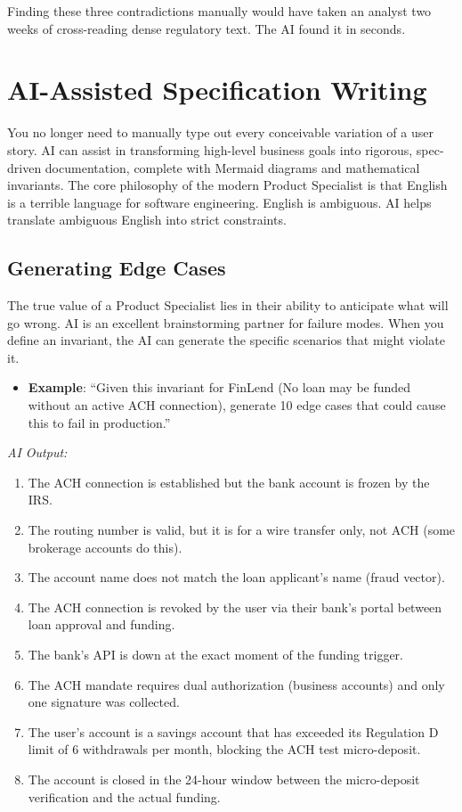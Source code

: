 Finding these three contradictions manually would have taken an analyst
two weeks of cross-reading dense regulatory text. The AI found it in
seconds.

\section{AI-Assisted Specification
Writing}\label{ai-assisted-specification-writing}

You no longer need to manually type out every conceivable variation of a
user story. AI can assist in transforming high-level business goals into
rigorous, spec-driven documentation, complete with Mermaid diagrams and
mathematical invariants. The core philosophy of the modern Product
Specialist is that English is a terrible language for software
engineering. English is ambiguous. AI helps translate ambiguous English
into strict constraints.

\subsection{Generating Edge Cases}\label{generating-edge-cases}

The true value of a Product Specialist lies in their ability to
anticipate what will go wrong. AI is an excellent brainstorming partner
for failure modes. When you define an invariant, the AI can generate the
specific scenarios that might violate it.

\begin{itemize}
\tightlist
\item
  \textbf{Example}: ``Given this invariant for FinLend (No loan may be
  funded without an active ACH connection), generate 10 edge cases that
  could cause this to fail in production.''
\end{itemize}

\emph{AI Output:}

\begin{enumerate}
\def\labelenumi{\arabic{enumi}.}
\tightlist
\item
  The ACH connection is established but the bank account is frozen by
  the IRS.
\item
  The routing number is valid, but it is for a wire transfer only, not
  ACH (some brokerage accounts do this).
\item
  The account name does not match the loan applicant's name (fraud
  vector).
\item
  The ACH connection is revoked by the user via their bank's portal
  between loan approval and funding.
\item
  The bank's API is down at the exact moment of the funding trigger.
\item
  The ACH mandate requires dual authorization (business accounts) and
  only one signature was collected.
\item
  The user's account is a savings account that has exceeded its
  Regulation D limit of 6 withdrawals per month, blocking the ACH test
  micro-deposit.
\item
  The account is closed in the 24-hour window between the micro-deposit
  verification and the actual funding.
\end{enumerate}

